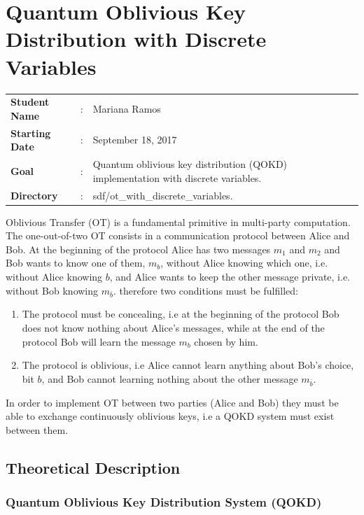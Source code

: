 \clearpage
\section{Quantum Oblivious Key Distribution with Discrete Variables}

\begin{tcolorbox}	
\begin{tabular}{p{2.75cm} p{0.2cm} p{10.5cm}} 	
\textbf{Student Name}  &:& Mariana Ramos\\
\textbf{Starting Date} &:& September 18, 2017\\
\textbf{Goal}          &:& Quantum oblivious key distribution (QOKD) implementation with discrete variables.\\
\textbf{Directory}     &:& sdf/ot\_with\_discrete\_variables.
\end{tabular}
\end{tcolorbox}

Oblivious Transfer (OT) is a fundamental primitive in multi-party computation. The one-out-of-two OT consists in a communication protocol between Alice and Bob. At the beginning of the protocol Alice has two messages $m_1$ and $m_2$ and Bob wants to know one of them, $m_b$, without Alice knowing which one, i.e. without Alice knowing $b$, and Alice wants to keep the other message private, i.e. without Bob knowing $m_{\bar{b}}$. therefore two conditions must be fulfilled:
\begin{enumerate}
	\item{The protocol must be concealing, i.e at the beginning of the protocol Bob does not know nothing about Alice's messages, while at the end of the protocol Bob will learn the message $m_{b}$ chosen by him.}
	\item{The protocol is oblivious, i.e Alice cannot learn anything about Bob's choice, bit $b$, and Bob cannot learning nothing about the other message $m_{\bar{b}}$.}
\end {enumerate}

In order to implement OT between two parties (Alice and Bob) they must be able to exchange continuously oblivious keys, i.e a QOKD system must exist between them.

\subsection{Theoretical Description}
\subsubsection{Quantum Oblivious Key Distribution System (QOKD)}

